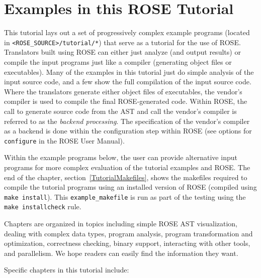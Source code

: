 \section{Examples in this ROSE Tutorial}

    This tutorial lays out a set of progressively
complex example programs (located in 
{\tt <ROSE\_SOURCE>/tutorial/*}) that serve as a tutorial for the use of ROSE.
Translators built using ROSE can either just analyze (and output results)
or compile the input programs just like a compiler (generating object files 
or executables).  Many of the examples in this tutorial just do simple analysis
of the input source code, and a few show the full compilation of the input source code.
Where the translators generate either object files of executables, the 
vendor's compiler is used to compile the final ROSE-generated code.  Within
ROSE, the call to generate source code from the AST and call the vendor's compiler
is referred to as the {\em backend processing}.  The specification of the vendor's compiler
as a backend is done within the configuration step within ROSE (see options for 
{\tt configure} in the ROSE User Manual).

Within the example programs below, the user can provide alternative input programs
for more complex evaluation of the tutorial examples and ROSE.  The end of the chapter,
section~\ref{TutorialMakefiles}, shows the makefiles required to compile the
tutorial programs using an installed version of ROSE (compiled using 
{\tt make install}).  This {\tt example\_makefile} is run as part of the testing using the 
{\tt make installcheck} rule.


Chapters are organized in topics including simple ROSE AST visualization,
dealing with complex data types, program analysis, program transformation
and optimization, correctness checking, binary support, interacting with
other tools, and parallelism. 
We hope readers can easily find the information they want. 

Specific chapters in this tutorial include: 

